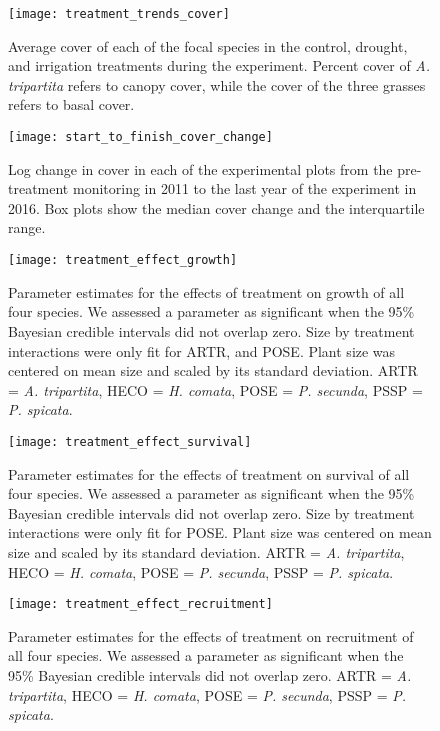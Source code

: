 \documentclass[11pt]{article}
\begin{document}
\begin{figure}[tbp]
	\centering
	\texttt{[image: treatment\_trends\_cover]}
	\caption{Average cover of each of the focal species in the control, drought, and irrigation treatments during the experiment. Percent cover of \textit{A. tripartita} refers to canopy cover, while the cover of the three grasses refers to basal cover. }
	\label{fig:coverTrends}
\end{figure}


\begin{figure}[tbp]
	\centering
	\texttt{[image: start\_to\_finish\_cover\_change]}
	\caption{Log change in cover in each of the experimental plots from the pre-treatment monitoring in 2011 to the last year of the experiment in 2016. Box plots show the median cover change and the interquartile range.}
	\label{fig:coverChange}
\end{figure}

\begin{figure}[tbp]
	\centering
	\texttt{[image: treatment\_effect\_growth]}
	\caption{Parameter estimates for the effects of treatment on growth of all four species. We assessed a parameter as significant when the 95\% Bayesian credible intervals did not overlap zero. Size by treatment interactions were only fit for ARTR, and POSE. Plant size was centered on mean size and scaled by its standard deviation. ARTR = \textit{A. tripartita}, HECO = \textit{H. comata}, POSE = \textit{P. secunda}, PSSP = \textit{P. spicata}. }
	\label{fig:growthTreat}
\end{figure}

\begin{figure}[tbp]
	\centering
	\texttt{[image: treatment\_effect\_survival]}
	\caption{Parameter estimates for the effects of treatment on survival of all four species. We assessed a parameter as significant when the 95\% Bayesian credible intervals did not overlap zero. Size by treatment interactions were only fit for POSE. Plant size was centered on mean size and scaled by its standard deviation.  ARTR = \textit{A. tripartita}, HECO = \textit{H. comata}, POSE = \textit{P. secunda}, PSSP = \textit{P. spicata}. }
	\label{fig:survivalTreat}
\end{figure}

\begin{figure}[tbp]
	\centering
	\texttt{[image: treatment\_effect\_recruitment]}
	\caption{Parameter estimates for the effects of treatment on recruitment of all four species. We assessed a parameter as significant when the 95\% Bayesian credible intervals did not overlap zero.  ARTR = \textit{A. tripartita}, HECO = \textit{H. comata}, POSE = \textit{P. secunda}, PSSP = \textit{P. spicata}. }
	\label{fig:recruitmentTreat}
\end{figure}
\end{document}
